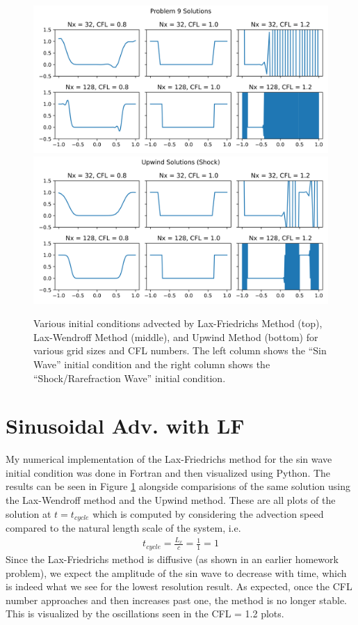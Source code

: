 \documentclass{article}
\begin{document}
\begin{figure}[t]
        \includegraphics[width=\textwidth]{../code/prob9_tstop.png}
        \includegraphics[width=\textwidth]{../code/upwind_shock_tstop.png}
    \emp
    \caption{Various initial conditions advected by Lax-Friedrichs Method (top),
    Lax-Wendroff Method (middle), and Upwind Method (bottom) for various grid sizes and
    CFL numbers. The left column shows the ``Sin Wave'' initial condition and
    the right column shows the ``Shock/Rarefraction Wave'' initial condition.}
    \label{fig:solutions}
\end{figure}

\section{Sinusoidal Adv. with LF}
My numerical implementation of the Lax-Friedrichs method for the sin wave initial
condition was done in Fortran and then
visualized using Python. The results can be seen in Figure \ref{fig:solutions}
alongside comparisions of the same solution using the Lax-Wendroff method and
the Upwind method. These are all plots of the solution at $t = t_{cycle}$ which
is computed by considering the advection speed compared to the natural
length scale of the system, i.e.
\begin{gather*}
    t_{cycle} = \frac{L_x}{c} = \frac{1}{1} = 1
\end{gather*}
Since the Lax-Friedrichs method is diffusive (as shown in an
earlier homework problem), we expect the amplitude of the sin wave to decrease
with time, which is indeed what we see for the lowest resolution result. As
expected, once the CFL number approaches and then increases past one, the
method is no longer stable. This is visualized by the oscillations seen in the
CFL = 1.2 plots. 
\end{document}
